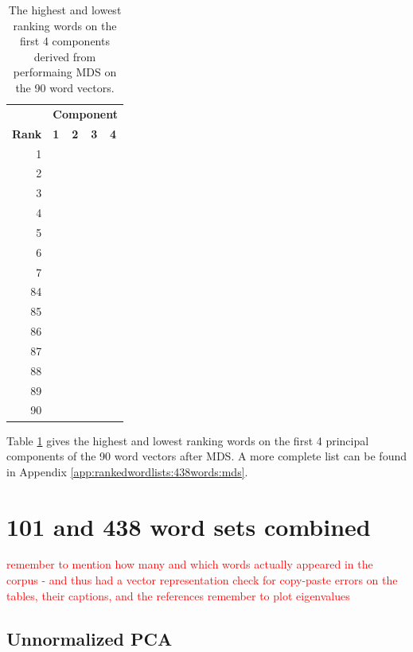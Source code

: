 \documentclass[10pt,letterpaper]{book}
\newcommand{\todo}[1]{\textcolor{red}{#1}}
\begin{document}
\begin{table}[!htbp]
    \begin{tabular}{| rllll | }
        \hline
         & \multicolumn{4}{c|}{\textbf{Component}} \\
        \textbf{Rank} & \textbf{1} & \textbf{2} & \textbf{3} & \textbf{4} \\
        \hline
        1 &  &  &  &  \\
        2 &  &  &  &  \\
        3 &  &  &  &  \\
        4 &  &  &  &  \\
        5 &  &  &  &  \\
        6 &  &  &  &  \\
        7 &  &  &  &  \\
        \hline
        84 &  &  &  &  \\
        85 &  &  &  &  \\
        86 &  &  &  &  \\
        87 &  &  &  &  \\
        88 &  &  &  &  \\
        89 &  &  &  &  \\
        90 &  &  &  &  \\
        \hline
    \end{tabular}
    \caption{The highest and lowest ranking words on the first 4 components 
    derived from performaing MDS on the 90 word vectors.}
    \label{tab:438wordsRankingsMDS}
\end{table}

Table \ref{tab:438wordsRankingsMDS} gives the highest and lowest
ranking words on the first 4 principal components of the 90 word 
vectors after MDS. A more complete list can be found in Appendix 
\ref{app:rankedwordlists:438words:mds}.

\section{101 and 438 word sets combined}

\todo{remember to mention how many and which words actually appeared in the corpus - and thus had a vector representation}
\todo{check for copy-paste errors on the tables, their captions, and the references}
\todo{remember to plot eigenvalues}

\subsection{Unnormalized PCA}
\end{document}
